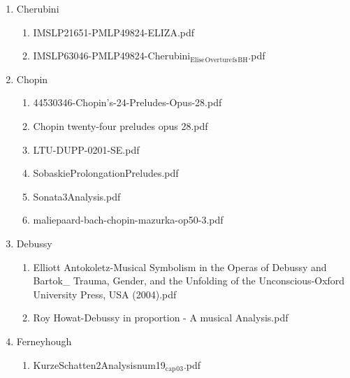 \documentclass[11pt]{article}
\begin{document}
\begin{enumerate}
\item Cherubini
\label{sec-1-1-1-1-31-7-6}
\begin{enumerate}
\item IMSLP21651-PMLP49824-ELIZA.pdf
\label{sec-1-1-1-1-31-7-6-1}

\item IMSLP63046-PMLP49824-Cherubini$_{\text{Elise}}$$_{\text{Overture}}$$_{\text{fs}}$$_{\text{BH}}$.pdf
\label{sec-1-1-1-1-31-7-6-2}
\end{enumerate}

\item Chopin
\label{sec-1-1-1-1-31-7-7}
\begin{enumerate}
\item 44530346-Chopin’s-24-Preludes-Opus-28.pdf
\label{sec-1-1-1-1-31-7-7-1}

\item Chopin twenty-four preludes opus 28.pdf
\label{sec-1-1-1-1-31-7-7-2}

\item LTU-DUPP-0201-SE.pdf
\label{sec-1-1-1-1-31-7-7-3}

\item SobaskieProlongationPreludes.pdf
\label{sec-1-1-1-1-31-7-7-4}

\item Sonata3Analysis.pdf
\label{sec-1-1-1-1-31-7-7-5}

\item maliepaard-bach-chopin-mazurka-op50-3.pdf
\label{sec-1-1-1-1-31-7-7-6}
\end{enumerate}

\item Debussy
\label{sec-1-1-1-1-31-7-8}
\begin{enumerate}
\item Elliott Antokoletz-Musical Symbolism in the Operas of Debussy and Bartok\_ Trauma, Gender, and the Unfolding of the Unconscious-Oxford University Press, USA (2004).pdf
\label{sec-1-1-1-1-31-7-8-1}

\item Roy Howat-Debussy in proportion - A musical Analysis.pdf
\label{sec-1-1-1-1-31-7-8-2}
\end{enumerate}

\item Ferneyhough
\label{sec-1-1-1-1-31-7-9}
\begin{enumerate}
\item KurzeSchatten2Analysisnum19$_{\text{cap}}$$_{\text{03}}$.pdf
\label{sec-1-1-1-1-31-7-9-1}


\end{enumerate}
\end{enumerate}
\end{document}
